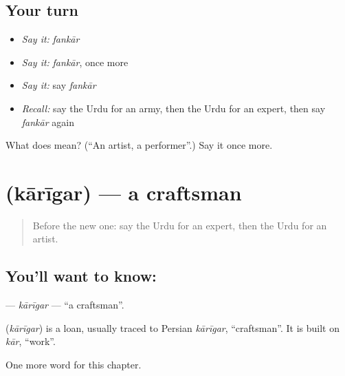 \subsection*{Your turn}
\begin{itemize}
\raggedright
  \item \emph{Say it:} \emph{fankār}
  \item \emph{Say it:} \emph{fankār}, once more
  \item \emph{Say it:} say \emph{fankār}
  \item \emph{Recall:} say the Urdu for an army, then the Urdu for an expert, then say \emph{fankār} again
\end{itemize}

\begin{tcolorbox}[breakable,colback=teal!4,colframe=teal!35!black,title={Before you move on}]
What does  mean? (\textquotedblleft{}An artist, a performer\textquotedblright{}.) Say it once more.
\end{tcolorbox}
\section[\texorpdfstring{\ur{کاریگر} (kārīgar)}{کاریگر (kārīgar)}]{ (kārīgar) — a craftsman}

\label{lesson:UR-C238-karigar}



\begin{quote}
Before the new one: say the Urdu for an expert, then the Urdu for an artist.
\end{quote}

\subsection*{You'll want to know: }
\textbf{} — \emph{kārīgar} — \textquotedblleft{}a craftsman\textquotedblright{}.

\begin{cousinweb}
\textbf{} (\emph{kārīgar}) is a loan, usually traced to Persian \emph{kārīgar}, \textquotedblleft{}craftsman\textquotedblright{}. It is built on \emph{kār}, \textquotedblleft{}work\textquotedblright{}.
\end{cousinweb}

\begin{grammarlens}[title={What you've built}]
One more word for this chapter.
\end{grammarlens}

